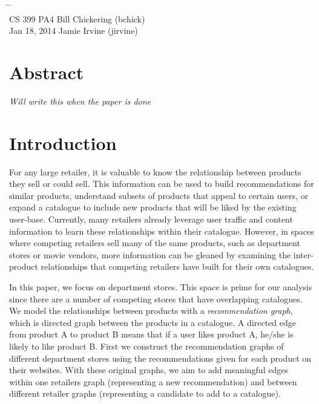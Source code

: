 \documentclass[10pt]{article}
\begin{document}

{\LARGE\bf
    \begin{tabbing}
    \hspace{2.8in} \= \hspace{1.3in} \= \hspace{1.2in} \= \\

        CS 399 \> PA4 \> Bill Chickering (bchick)\\
        \normalsize Jan 18, 2014 \> \> Jamie Irvine (jirvine)
        \end{tabbing}
} \vspace{.4in}

\section*{Abstract}
\emph{Will write this when the paper is done}

\section*{Introduction}
For any large retailer, it is valuable to know the relationship between
products they sell or could sell. This information can be used to build
recommendations for similar products, understand subsets of products that
appeal to certain users, or expand a catalogue to include new products that
will be liked by the existing user-base. Currently, many retailers already
leverage user traffic and content information to learn these relationships
within their catalogue. However, in spaces where competing retailers sell
many of the same products, such as department stores or movie vendors, more
information can be gleaned by examining the inter-product relationships that
competing retailers have built for their own catalogues.

In this paper, we focus on department stores. This space is prime for our
analysis since there are a number of competing stores that have overlapping
catalogues. We model the relationships between products with a
\emph{recommendation graph}, which is directed graph between the products in a
catalogue. A directed edge from product A to product B means that if a user
likes product A, he/she is likely to like product B. First we construct the
recommendation graphs of different department stores using the
recommendations given for each product on their websites. With these
original graphs, we aim to add meaningful edges within one retailers graph
(representing a new recommendation) and between different retailer graphs
(representing a candidate to add to a catalogue). 
\end{document}
